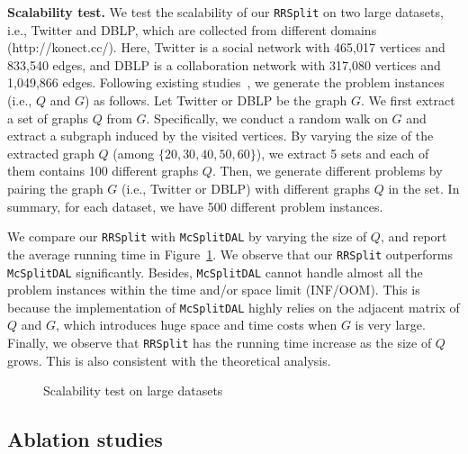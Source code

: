 {\revision
\smallskip
\noindent\textbf{Scalability test.} We test the scalability of our \texttt{RRSplit} on two large datasets, i.e., \textsf{Twitter} and \textsf{DBLP}, which are collected from different domains (http://konect.cc/). Here, \textsf{Twitter} is a social network with 465,017 vertices and 833,540 edges, and \textsf{DBLP} is a collaboration network with 317,080 vertices and 1,049,866 edges. Following existing studies~\cite{arai2023gup,jin2023circinus,sun2023efficient}, we generate the problem instances (i.e., $Q$ and $G$) as follows. Let \textsf{Twitter} or \textsf{DBLP} be the graph $G$. We first extract a set of graphs $Q$ from $G$. Specifically, we conduct a random walk on $G$ and extract a subgraph induced by the visited vertices. By varying the size of the extracted graph $Q$ (among $\{20,30,40,50,60\}$), we extract 5 sets and each of them contains 100 different graphs $Q$.
%
Then, we generate different problems by pairing the graph $G$ (i.e., \textsf{Twitter} or \textsf{DBLP}) with different graphs $Q$ in the set. In summary, for each dataset, we have 500 different problem instances. 

We compare our \texttt{RRSplit} with \texttt{McSplitDAL} by varying the size of $Q$, and report the average running time in Figure~\ref{fig:scalability_test}. We observe that our \texttt{RRSplit} outperforms \texttt{McSplitDAL} significantly.
Besides, \texttt{McSplitDAL} cannot handle almost all the problem instances within the time and/or space limit (INF/OOM). This is because the implementation of \texttt{McSplitDAL} highly relies on the adjacent matrix of $Q$ and $G$, which introduces huge space and time costs when $G$ is very large. Finally, we observe that \texttt{RRSplit} has the running time increase as the size of $Q$ grows. This is also consistent with the theoretical analysis.
}

\begin{figure}[]
        \vspace{-0.2in}
	\caption{\revision Scalability test on large datasets}
	\label{fig:scalability_test}
\end{figure}

\subsection{Ablation studies}

